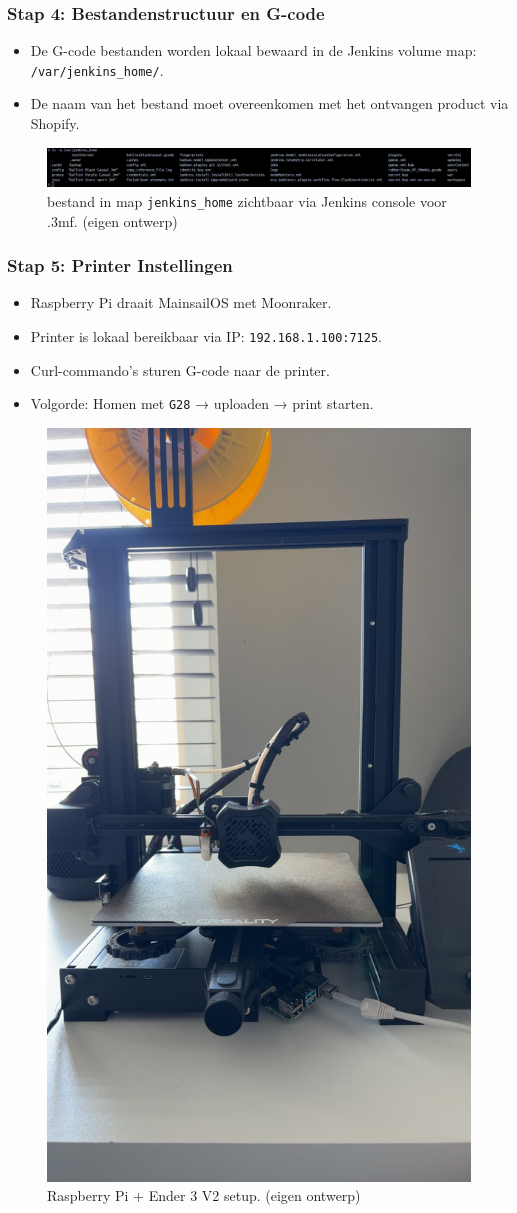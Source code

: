 \begin{enumerate}
\subsubsection{Stap 4: Bestandenstructuur en G-code}
\begin{itemize}
    \item De G-code bestanden worden lokaal bewaard in de Jenkins volume map: \texttt{/var/jenkins\_home/}.
    \item De naam van het bestand moet overeenkomen met het ontvangen product via Shopify.
\end{itemize}

\vspace{0.5em}
\begin{figure}[H]
    \centering
    \includegraphics[width=1\linewidth]{foto's/JenkinsHome.png}
    \caption{bestand in map \texttt{jenkins\_home} zichtbaar via Jenkins console voor .3mf. (eigen ontwerp)}
    \label{fig:Jenkins_home}
\end{figure}

\subsubsection{Stap 5: Printer Instellingen}
\begin{itemize}
    \item Raspberry Pi draait MainsailOS met Moonraker.
    \item Printer is lokaal bereikbaar via IP: \texttt{192.168.1.100:7125}.
    \item Curl-commando’s sturen G-code naar de printer.
    \item Volgorde: Homen met \texttt{G28} → uploaden → print starten.
\end{itemize}

\vspace{0.5em}
\begin{figure}[H]
    \centering
    \includegraphics[width=0.3\linewidth]{foto's/Ender3WithRaspberryPi.JPG}
    \caption{Raspberry Pi + Ender 3 V2 setup. (eigen ontwerp)}
    \label{fig:3Dprinter}
\end{figure}


\end{enumerate}
